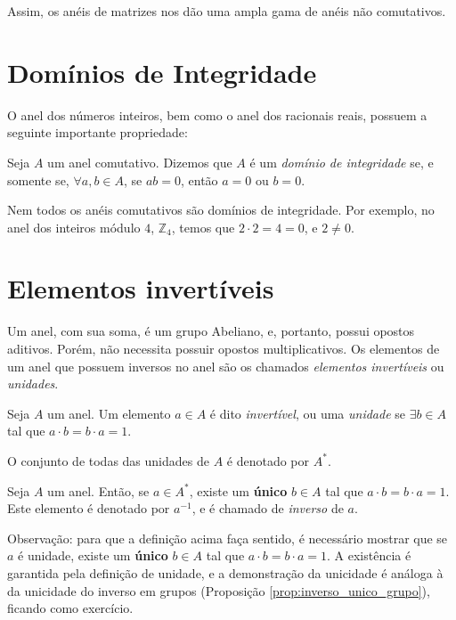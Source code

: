 Assim, os anéis de matrizes nos dão uma ampla gama de anéis não comutativos.
\section{Domínios de Integridade}
O anel dos números inteiros, bem como o anel dos racionais reais, possuem a seguinte importante propriedade:
\begin{definition}
Seja $A$ um anel comutativo. Dizemos que $A$ é um \emph{domínio de integridade} se, e somente se, $\forall a, b \in A$, se $ab=0$, então $a=0$ ou $b=0$.
\end{definition}

Nem todos os anéis comutativos são domínios de integridade. Por exemplo, no anel dos inteiros módulo $4$, $\mathbb Z_4$, temos que $2\cdot 2=4=0$, e $2\neq 0$.

\section{Elementos invertíveis}
Um anel, com sua soma, é um grupo Abeliano, e, portanto, possui opostos aditivos. Porém, não necessita possuir opostos multiplicativos. Os elementos de um anel que possuem inversos no anel são os chamados \emph{elementos invertíveis} ou \emph{unidades}.
\begin{definition}
    Seja $A$ um anel.
    Um elemento $a \in A$ é dito \emph{invertível}, ou uma \emph{unidade} se $\exists b \in A$ tal que $a \cdot b = b \cdot a = 1$.
    
    O conjunto de todas das unidades de $A$ é denotado por $A^*$.
\end{definition}

\begin{definition}
    Seja $A$ um anel.
    Então, se $a \in A^*$, existe um \textbf{único} $b \in A$ tal que $a \cdot b = b \cdot a = 1$. Este elemento é denotado por $a^{-1}$, e é chamado de \emph{inverso} de $a$.
\end{definition}

Observação: para que a definição acima faça sentido, é necessário mostrar que se $a$ é unidade, existe um \textbf{único} $b \in A$ tal que $a \cdot b = b \cdot a = 1$.
A existência é garantida pela definição de unidade, e a demonstração da unicidade é análoga à da unicidade do inverso em grupos (Proposição \ref{prop:inverso_unico_grupo}), ficando como exercício.


